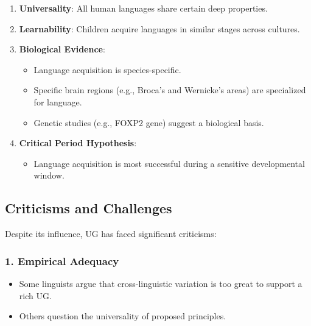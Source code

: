 \documentclass[12pt]{article}
\newcommand{\tightlist}{\itemsep 0pt\parskip 0pt\parsep 0pt}
\begin{document}
\begin{enumerate}
\def\labelenumi{\arabic{enumi}.}
\tightlist
\item
  \textbf{Universality}: All human languages share certain deep
  properties.
\item
  \textbf{Learnability}: Children acquire languages in similar stages
  across cultures.
\item
  \textbf{Biological Evidence}:

  \begin{itemize}
  \tightlist
  \item
    Language acquisition is species-specific.
  \item
    Specific brain regions (e.g., Broca's and Wernicke's areas) are
    specialized for language.
  \item
    Genetic studies (e.g., FOXP2 gene) suggest a biological basis.
  \end{itemize}
\item
  \textbf{Critical Period Hypothesis}:

  \begin{itemize}
  \tightlist
  \item
    Language acquisition is most successful during a sensitive
    developmental window.
  \end{itemize}
\end{enumerate}

\hypertarget{criticisms-and-challenges-2}{%
\subsection{Criticisms and
Challenges}\label{criticisms-and-challenges-2}}

Despite its influence, UG has faced significant criticisms:

\hypertarget{empirical-adequacy-1}{%
\subsubsection{\texorpdfstring{1. \textbf{Empirical
Adequacy}}{1. Empirical Adequacy}}\label{empirical-adequacy-1}}

\begin{itemize}
\tightlist
\item
  Some linguists argue that cross-linguistic variation is too great to
  support a rich UG.
\item
  Others question the universality of proposed principles.
\end{itemize}
\end{document}
